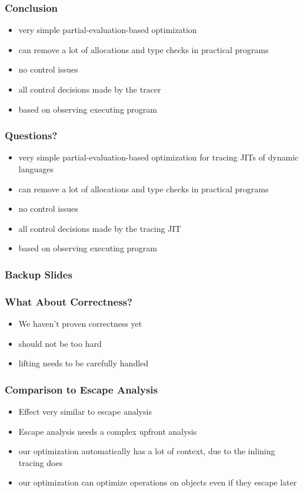 \documentclass[utf8x]{beamer}
\begin{document}
\begin{frame}
  \frametitle{Conclusion}
  \begin{itemize}
      \item very simple partial-evaluation-based optimization
      \item can remove a lot of allocations and type checks in practical programs
      \item no control issues
      \item all control decisions made by the tracer
      \item based on observing executing program
  \end{itemize}
\end{frame}

\begin{frame}
  \frametitle{Questions?}
  \begin{itemize}
      \item very simple partial-evaluation-based optimization for tracing JITs of dynamic languages
      \item can remove a lot of allocations and type checks in practical programs
      \item no control issues
      \item all control decisions made by the tracing JIT
      \item based on observing executing program
  \end{itemize}
\end{frame}

\begin{frame}
  \frametitle{Backup Slides}
\end{frame}

\begin{frame}
  \frametitle{What About Correctness?}
  \begin{itemize}
      \item We haven't proven correctness yet
      \item should not be too hard
      \item lifting needs to be carefully handled
  \end{itemize}
\end{frame}

\begin{frame}
  \frametitle{Comparison to Escape Analysis}
  \begin{itemize}
      \item Effect very similar to escape analysis
      \item Escape analysis needs a complex upfront analysis
      \item our optimization automatically has a lot of context, due to the inlining tracing does
      \item our optimization can optimize operations on objects even if they escape later
  \end{itemize}
\end{frame}
\end{document}
